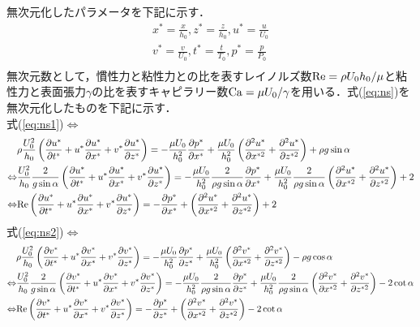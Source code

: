 \documentclass[autodetect-engine,dvipdfmx-if-dvi,ja=standard,a4paper,11pt]{bxjsarticle} %
\begin{document}
\　無次元化したパラメータを下記に示す．
\begin{equation}
\begin{split}
x^*=\frac{x}{h_0},z^*=\frac{z}{h_0},u^*=\frac{u}{U_0}\\
v^*=\frac{v}{U_0},t^*=\frac{t}{T_0},p^*=\frac{p}{P_0}\\
\end{split}
\end{equation}
無次元数として，慣性力と粘性力との比を表すレイノルズ数${\rm Re}=\rho U_0h_0/\mu$と粘性力と表面張力$\gamma$の比を表すキャピラリー数${\rm Ca}=\mu U_0/\gamma$を用いる．式(\ref{eq:ns})を無次元化したものを下記に示す．\\
式(\ref{eq:ns1})$\Leftrightarrow$
\begin{equation*}
\begin{split}
&\rho\frac{U_0^2}{h_0}\left(\frac{\partial u^*}{\partial t^*}+u^*\frac{\partial u^*}{\partial x^*}+v^*\frac{\partial u^*}{\partial z^*}\right)=-\frac{\mu U_0}{h_0^2}\frac{\partial p^*}{\partial x^*}+\frac{\mu U_0}{h_0^2}\left(\frac{\partial ^2u^*}{\partial x^{*2}}+\frac{\partial^2 u^*}{\partial z^{*2}}\right)+\rho g\sin\alpha\\
\Leftrightarrow&\frac{U_0^2}{h_0}\frac{2}{g\sin\alpha}\left(\frac{\partial u^*}{\partial t^*}+u^*\frac{\partial u^*}{\partial x^*}+v^*\frac{\partial u^*}{\partial z^*}\right)=-\frac{\mu U_0}{h_0^2}\frac{2}{\rho g\sin\alpha}\frac{\partial p^*}{\partial x^*}+\frac{\mu U_0}{h_0^2}\frac{2}{\rho g\sin\alpha}\left(\frac{\partial ^2u^*}{\partial x^{*2}}+\frac{\partial^2 u^*}{\partial z^{*2}}\right)+2\\
\Leftrightarrow&{\rm Re}\left(\frac{\partial u^*}{\partial t^*}+u^*\frac{\partial u^*}{\partial x^*}+v^*\frac{\partial u^*}{\partial z^*}\right)=-\frac{\partial p^*}{\partial x^*}+\left(\frac{\partial ^2u^*}{\partial x^{*2}}+\frac{\partial^2 u^*}{\partial z^{*2}}\right)+2
\end{split}
\end{equation*}
式(\ref{eq:ns2})$\Leftrightarrow$
\begin{equation*}
\begin{split}
&\rho\frac{U_0^2}{h_0}\left(\frac{\partial v^*}{\partial t^*}+u^*\frac{\partial v^*}{\partial x^*}+v^*\frac{\partial v^*}{\partial z^*}\right)=-\frac{\mu U_0}{h_0^2}\frac{\partial p^*}{\partial z^*}+\frac{\mu U_0}{h_0^2}\left(\frac{\partial ^2v^*}{\partial x^{*2}}+\frac{\partial ^2v^*}{\partial z^{*2}}\right)-\rho g\cos\alpha\\
\Leftrightarrow&\frac{U_0^2}{h_0}\frac{2}{g\sin\alpha}\left(\frac{\partial v^*}{\partial t^*}+u^*\frac{\partial v^*}{\partial x^*}+v^*\frac{\partial v^*}{\partial z^*}\right)=-\frac{\mu U_0}{h_0^2}\frac{2}{\rho g\sin\alpha}\frac{\partial p^*}{\partial z^*}+\frac{\mu U_0}{h_0^2}\frac{2}{\rho g\sin\alpha}\left(\frac{\partial ^2v^*}{\partial x^{*2}}+\frac{\partial ^2v^*}{\partial z^{*2}}\right)-2\cot\alpha\\
\Leftrightarrow&{\rm Re}\left(\frac{\partial v^*}{\partial t^*}+u^*\frac{\partial v^*}{\partial x^*}+v^*\frac{\partial v^*}{\partial z^*}\right)=-\frac{\partial p^*}{\partial z^*}+\left(\frac{\partial ^2v^*}{\partial x^{*2}}+\frac{\partial ^2v^*}{\partial z^{*2}}\right)-2\cot\alpha
\end{split}
\end{equation*}
\end{document}
